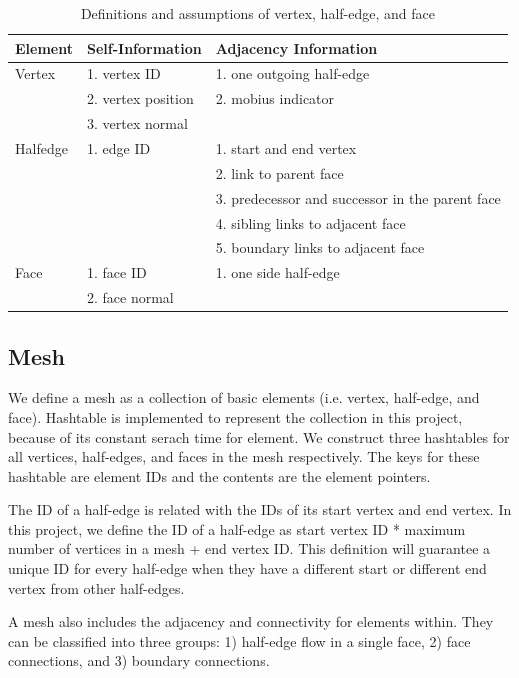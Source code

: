 \documentclass[12pt]{article}
\begin{document}
\begin{table}[ht]
\centering
\begin{tabular}{| l | p{} | p{}|}

\hline
Element & Self-Information & Adjacency Information  \\
\hline
Vertex  & 1. vertex ID & 1. one outgoing half-edge   \\
& 2. vertex position & 2. mobius indicator \\
& 3. vertex normal & \\
\hline
Halfedge & 1. edge ID & 1. start and end vertex\\
& & 2. link to parent face\\
& & 3. predecessor and successor in the parent face\\
& & 4. sibling links to adjacent face\\
& & 5. boundary links to adjacent face \\
\hline
Face    &  1. face ID & 1. one side half-edge\\
& 2. face normal &\\
\hline
\end{tabular}
\caption{Definitions and assumptions of vertex, half-edge, and face} 
\label{table:vhfInfo}
\end{table}

\subsection{Mesh}
We define a mesh as a collection of basic elements (i.e. vertex, half-edge, and face). Hashtable is implemented to represent the collection in this project, because of its constant serach time for element. We construct three hashtables for all vertices, half-edges, and faces in the mesh respectively. The keys for these hashtable are element IDs and the contents are the element pointers.

The ID of a half-edge is related with the IDs of its start vertex and end vertex. In this project, we define the ID of a half-edge as start vertex ID * maximum number of vertices in a mesh + end vertex ID. This definition will guarantee a unique ID for every half-edge when they have a different start or different end vertex from other half-edges. 

A mesh also includes the adjacency and connectivity for elements within. They can be classified into three groups: 1) half-edge flow in a single face, 2) face connections, and 3) boundary connections.
\end{document}
